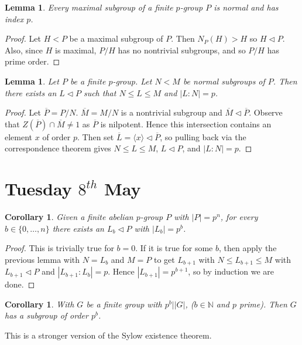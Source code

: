\documentclass[a4paper,10pt]{article}
\newcommand{\NN}{\mathbb{N}}
\newtheorem{Cor}[thm]{Corollary}
\newtheorem{Lem}[thm]{Lemma}
\begin{document}
\begin{Lem}
Every maximal subgroup of a finite $p$-group $P$ is normal and has index $p$.
\end{Lem}

\begin{proof}
Let $H < P$ be a maximal subgroup of $P$. Then $N_P(H) > H$ so $H \triangleleft P$. Also, since $H$ is maximal, $P / H$ has no nontrivial subgroups, and so $P / H$ has prime order. 
\end{proof}

\begin{Lem}
Let $P$ be a finite $p$-group. Let $N < M$ be normal subgroups of $P$. Then there exists an $L \triangleleft P$ such that $N \leq L \leq M$ and $|L : N| = p$. 
\end{Lem}

\begin{proof}
Let $\overline{P} = P / N$. $\overline{M} = M / N$ is a nontrivial subgroup and $\overline{M} \triangleleft \overline{P}$. Observe that $Z(\overline{P}) \cap \overline{M} \neq 1$ as $\overline{P}$ is nilpotent. Hence this intersection contains an element $x$ of order $p$. Then set $\overline{L} = \langle x \rangle \triangleleft \overline{P}$, so pulling back via the correspondence theorem gives $N \leq L \leq M$, $L \triangleleft P$, and $|L:N| = p$.
\end{proof}



\newpage
\section{Tuesday $8^{th}$ May}

\begin{Cor}
Given a finite abelian $p$-group $P$ with $|P| = p^n$, for every $b \in \{0, \dots, n\}$ there exists an $L_b \triangleleft P$ with $|L_b| = p^b$. 
\end{Cor}

\begin{proof}
This is trivially true for $b=0$. If it is true for some $b$, then apply the previous lemma with $N = L_b$ and $M = P$ to get $L_{b+1}$ with $N \leq L_{b+1} \leq M$ with $L_{b+1} \triangleleft P$ and $|L_{b+1} : L_b| = p$. Hence $|L_{b+1}| = p^{b+1}$, so by induction we are done. 
\end{proof}

\begin{Cor}
With $G$ be a finite group with $p^b | |G|$, ($b \in \NN$ and $p$ prime). Then $G$ has a subgroup of order $p^b$. 
\end{Cor}
This is a stronger version of the Sylow existence theorem. 
\end{document}
